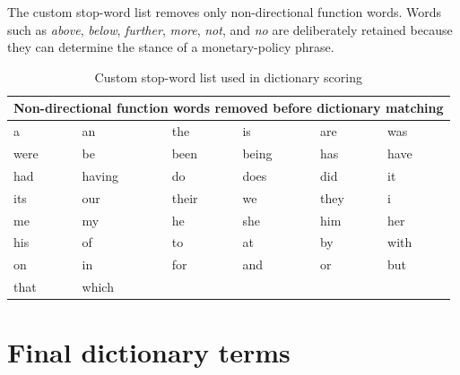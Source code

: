 The custom stop-word list removes only non-directional function words. Words
such as \emph{above}, \emph{below}, \emph{further}, \emph{more}, \emph{not},
and \emph{no} are deliberately retained because they can determine the stance
of a monetary-policy phrase.

\begin{table}[H]
\centering
\caption{Custom stop-word list used in dictionary scoring}
\label{tab:a1_stopwords}
\small
\begin{tabular}{llllll}
\toprule
\multicolumn{6}{c}{Non-directional function words removed before dictionary matching} \\
\midrule
a & an & the & is & are & was \\
were & be & been & being & has & have \\
had & having & do & does & did & it \\
its & our & their & we & they & i \\
me & my & he & she & him & her \\
his & of & to & at & by & with \\
on & in & for & and & or & but \\
that & which &  &  &  &  \\
\bottomrule
\end{tabular}
\end{table}


\section{Final dictionary terms}
\label{app:a1_terms}

